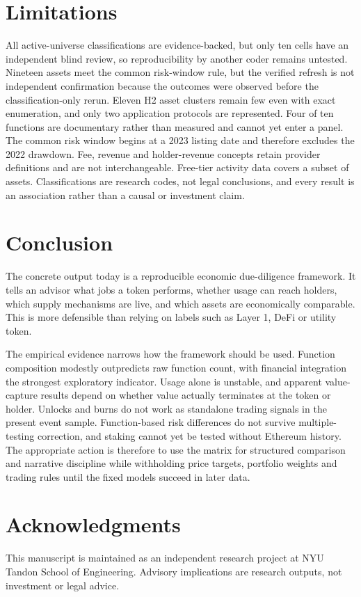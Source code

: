 \documentclass[10pt]{article}
\begin{document}
\section{Limitations}
All active-universe classifications are evidence-backed, but only ten cells have an independent blind review, so reproducibility by another coder remains untested. Nineteen assets meet the common risk-window rule, but the verified refresh is not independent confirmation because the outcomes were observed before the classification-only rerun. Eleven H2 asset clusters remain few even with exact enumeration, and only two application protocols are represented. Four of ten functions are documentary rather than measured and cannot yet enter a panel. The common risk window begins at a 2023 listing date and therefore excludes the 2022 drawdown. Fee, revenue and holder-revenue concepts retain provider definitions \citep{defillama2026definitions} and are not interchangeable. Free-tier activity data covers a subset of assets. Classifications are research codes, not legal conclusions, and every result is an association rather than a causal or investment claim.

\section{Conclusion}
The concrete output today is a reproducible economic due-diligence framework. It tells an advisor what jobs a token performs, whether usage can reach holders, which supply mechanisms are live, and which assets are economically comparable. This is more defensible than relying on labels such as Layer 1, DeFi or utility token.

The empirical evidence narrows how the framework should be used. Function composition modestly outpredicts raw function count, with financial integration the strongest exploratory indicator. Usage alone is unstable, and apparent value-capture results depend on whether value actually terminates at the token or holder. Unlocks and burns do not work as standalone trading signals in the present event sample. Function-based risk differences do not survive multiple-testing correction, and staking cannot yet be tested without Ethereum history. The appropriate action is therefore to use the matrix for structured comparison and narrative discipline while withholding price targets, portfolio weights and trading rules until the fixed models succeed in later data.

\section*{Acknowledgments}
This manuscript is maintained as an independent research project at NYU Tandon School of Engineering. Advisory implications are research outputs, not investment or legal advice.
\end{document}
